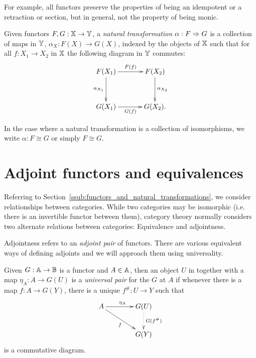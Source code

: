 For example, all functors preserve the properties of being an idempotent or a retraction or section,
but in general, not the property of being monic.

\begin{definition}\label{def:natural_transformation}
  Given functors $F,G:\mathbb{X} \to \mathbb{Y}$, a \emph{natural transformation} $\alpha:F \Rightarrow G$ is a collection
  of maps in $\mathbb{Y}$, $\alpha_X : F(X) \to G(X)$, indexed by the objects of $\mathbb{X}$ such that for all
  $f:X_1 \to X_2$ in $\mathbb{X}$ the following diagram in $\mathbb{Y}$ commutes:
  \[\xymatrix @R+10pt @C+10pt{
      F(X_1) \ar[r]^{F(f)} \ar[d]_{\alpha_{X_1}} & F(X_2) \ar[d]^{\alpha_{X_2}}\\
      G(X_1) \ar[r]_{G(f)} &  G(X_2).
    }
  \]
\end{definition}

In the case where a natural transformation is a collection of isomorphisms, we write $\alpha: F
\cong G$ or simply $F\cong G$.



\section{Adjoint functors and equivalences}
\label{sec:adjoint-functors-and-equivalences}

Referring to Section~\ref{ssub:functors_and_natural_transformations}, we consider relationships
between categories. While two categories may be isomorphic (i.e. there is an invertible functor
between them), category theory normally considers two alternate relations between categories:
Equivalence and adjointness.

Adjointness refers to an \emph{adjoint pair} of functors. There are various equivalent ways of
defining adjoints and we will approach them using universality.

\begin{definition}\label{def:universal_pair}
  Given $G:\mathbb{A}\to\mathbb{B}$ is a functor and $A\in \mathbb{A}$, then an object $U$ in \B together with a map
  $\eta_A:A\to G(U)$ is a \emph{universal pair} for the $G$ at $A$ if whenever there is a map
  $f:A\to G(Y)$, there is a unique $f^{\#}:U\to Y$ such that
  \[
    \xymatrix@C+15pt{
      A \ar[r]^{\eta_A} \ar[dr]_{f} & G(U) \ar@{.>}[d]^{G(f^{\#})}\\
      & G(Y)
    }
  \]
  is a commutative diagram.
\end{definition}

